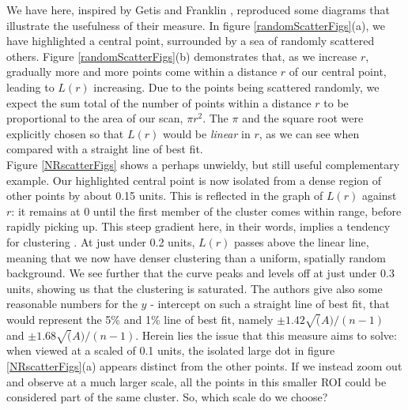 \documentclass[11pt]{article}
\begin{document}
We have here, inspired by Getis and Franklin \cite{getisAndFranklin}, reproduced some diagrams that illustrate the usefulness of their measure. In figure \ref{randomScatterFigs}(a), we have highlighted a central point, surrounded by a sea of randomly scattered others. Figure \ref{randomScatterFigs}(b) demonstrates that, as we increase $r$, gradually more and more points come within a distance $r$ of our central point, leading to $L(r)$ increasing. Due to the points being scattered randomly, we expect the sum total of the number of points within a distance $r$ to be proportional to the area of our scan, $\pi r^2$. The $\pi$ and the square root were explicitly chosen so that $L(r)$ would be \textit{linear} in $r$, as we can see when compared with a straight line of best fit. \\

Figure \ref{NRscatterFigs} shows a perhaps unwieldy, but still useful complementary example. Our highlighted central point is now isolated from a dense region of other points by about 0.15 units. This is reflected in the graph of $L(r)$ against $r$: it remains at 0 until the first member of the cluster comes within range, before rapidly picking up. This steep gradient here, in their words, implies a tendency for clustering \cite{getisAndFranklin}. At just under 0.2 units, $L(r)$ passes above the linear line, meaning that we now have denser clustering than a uniform, spatially random background. We see further that the curve peaks and levels off at just under 0.3 units, showing us that the clustering is saturated. The authors give also some reasonable numbers for the $y$ - intercept on such a straight line of best fit, that would represent the 5\% and 1\% line of best fit, namely $\pm 1.42 \sqrt(A)/(n-1)$ and $\pm 1.68 \sqrt(A)/(n-1)$. Herein lies the issue that this measure aims to solve: when viewed at a scaled of 0.1 units, the isolated large dot in figure \ref{NRscatterFigs}(a) appears distinct from the other points. If we instead zoom out and observe at a much larger scale, all the points in this smaller ROI could be considered part of the same cluster. So, which scale do we choose?\\
\end{document}
